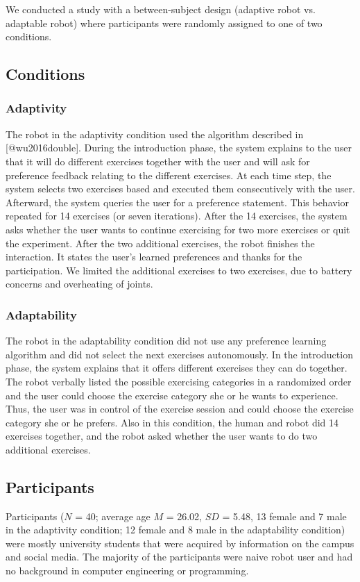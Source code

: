 We conducted a study with a between-subject design (adaptive robot vs. adaptable robot) where participants were randomly assigned to one of two conditions. 

\subsection{Conditions}
\subsubsection{Adaptivity}
The robot in the adaptivity condition used the algorithm described in [@wu2016double]. During the introduction phase, the system explains to the user that it will do different exercises together with the user and will ask for preference feedback relating to the different exercises. At each time step, the system selects two exercises based and executed them consecutively with the user. Afterward, the system queries the user for a preference statement. This behavior repeated for 14 exercises (or seven iterations). After the 14 exercises, the system asks whether the user wants to continue exercising for two more exercises or quit the experiment. After the two additional exercises, the robot finishes the interaction. It states the user's learned preferences and thanks for the participation. We limited the additional exercises to two exercises, due to battery concerns and overheating of joints. 

\subsubsection{Adaptability}
The robot in the adaptability condition did not use any preference learning algorithm and did not select the next exercises autonomously. In the introduction phase, the system explains that it offers different exercises they can do together. The robot verbally listed the possible exercising categories in a randomized order and the user could choose the exercise category she or he wants to experience. Thus, the user was in control of the exercise session and could choose the exercise category she or he prefers. Also in this condition, the human and robot did 14 exercises together, and the robot asked whether the user wants to do two additional exercises. 

\subsection{Participants}
Participants ($N$ = 40; average age $M$ = 26.02, $SD$ = 5.48, 13 female and 7 male  in the adaptivity condition; 12 female and 8 male in the adaptability condition) were mostly university students that were acquired by information on the campus and social media. The majority of the participants were naive robot user and had no background in computer engineering or programming.

